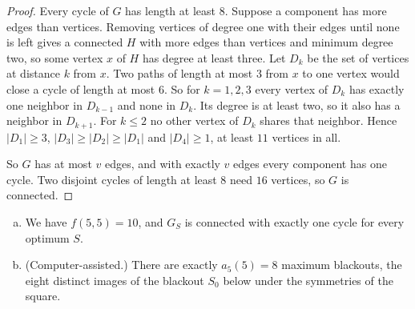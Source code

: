 \begin{proof}
Every cycle of $G$ has length at least $8$. Suppose a component has more edges than
vertices. Removing vertices of degree one with their edges until none is left gives a connected
$H$ with more edges than vertices and minimum degree two, so some vertex $x$ of $H$ has degree
at least three. Let $D_k$
be the set of vertices at distance $k$ from $x$. Two paths of length at most $3$ from $x$ to
one vertex would close a cycle of length at most $6$. So for $k=1,2,3$ every vertex of $D_k$
has exactly one neighbor in $D_{k-1}$ and none in $D_k$. Its degree is at least two, so it
also has a neighbor in $D_{k+1}$. For $k\le2$ no other vertex of $D_k$ shares that neighbor.
Hence
$|D_1|\ge3$, $|D_3|\ge|D_2|\ge|D_1|$ and $|D_4|\ge1$, at least $11$ vertices in all.

So $G$ has at most $v$ edges, and with exactly $v$ edges every component has one cycle. Two
disjoint cycles of length at least $8$ need $16$ vertices, so $G$ is connected.
\end{proof}

\begin{theorem}\label{thm:fivefive}
\begin{enumerate}[(a)]
\item We have $f(5,5)=10$, and $G_S$ is connected with exactly one cycle for every optimum $S$.
\item (Computer-assisted.) There are exactly $a_5(5)=8$ maximum blackouts, the eight distinct
images of the blackout $S_0$ below under the symmetries of the square.
\end{enumerate}
\end{theorem}

